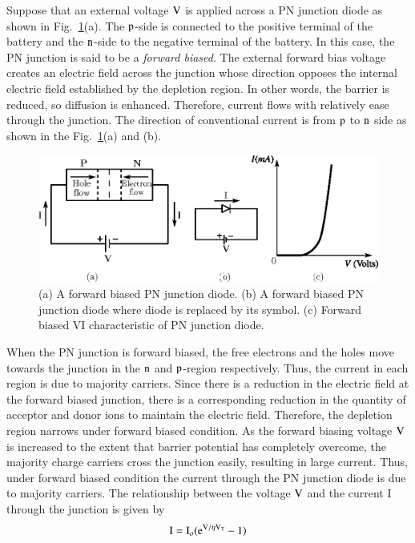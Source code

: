 Suppose that an external voltage $\textrm{V}$ is applied across a PN junction diode as shown in Fig.~\ref{fig1.17}(a). The $\textrm{p}$-side is connected to the positive terminal of the battery and the $\textrm{n}$-side to the negative terminal of the battery. In this case, the PN junction is said to be a {\em forward biased}. The external forward bias voltage creates an electric field across the junction whose direction opposes the internal electric field established by the depletion region. In other words, the barrier is reduced, so diffusion is enhanced. Therefore, current flows with relatively ease through the junction. The direction of conventional current is from $\textrm{p}$ to $\textrm{n}$ side as shown in the Fig.~\ref{fig1.17}(a) and (b).
\begin{figure}[H]
\centering
\includegraphics{chap1/fig1.17.eps}
\caption{(a) A forward biased PN junction diode. (b) A forward biased PN junction diode where diode is replaced by its symbol. (c) Forward biased VI characteristic of PN junction diode.}\label{fig1.17}
\end{figure}

When the PN junction is forward biased, the free electrons and the holes move towards the junction in the $\textrm{n}$ and $\textrm{p}$-region respectively. Thus, the current in each region is due to majority carriers. Since there is a reduction in the electric field at the forward biased junction, there is a corresponding reduction in the quantity of acceptor and donor ions to maintain the electric field. Therefore, the depletion region narrows under forward biased condition. As the forward biasing voltage $\textrm{V}$ is increased to the extent that barrier potential has completely overcome, the majority charge carriers cross the junction easily, resulting in large current. Thus, under forward biased condition the current through the PN junction diode is due to majority carriers. The relationship between the voltage $\textrm{V}$ and the current I through the junction is given by
\begin{equation}
\textrm{I}=\textrm{I}_{o}(\textrm{e}^{\textrm{V}/\eta \textrm{V}_{\textrm{T}}}-1)\label{eq1.4}
\end{equation}

